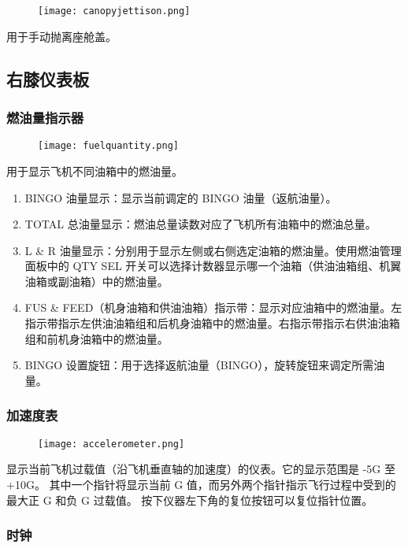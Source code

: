 \begin{figure}[htb]
  \center
  \texttt{[image: canopyjettison.png]}
\end{figure}
用于手动抛离座舱盖。

\subsection{右膝仪表板}

\subsubsection{燃油量指示器}

\begin{figure}[htb]
  \center
  \texttt{[image: fuelquantity.png]}
\end{figure}
用于显示飞机不同油箱中的燃油量。

\begin{enumerate}
  \item BINGO 油量显示：显示当前调定的 BINGO 油量（返航油量）。
  \item TOTAL 总油量显示：燃油总量读数对应了飞机所有油箱中的燃油总量。
  \item L \& R 油量显示：分别用于显示左侧或右侧选定油箱的燃油量。使用燃油管理面板中的 QTY SEL 开关可以选择计数器显示哪一个油箱（供油油箱组、机翼油箱或副油箱）中的燃油量。
  \item FUS \& FEED（机身油箱和供油油箱）指示带：显示对应油箱中的燃油量。左指示带指示左供油油箱组和后机身油箱中的燃油量。右指示带指示右供油油箱组和前机身油箱中的燃油量。
  \item BINGO 设置旋钮：用于选择返航油量（BINGO），旋转旋钮来调定所需油量。
\end{enumerate}

\subsubsection{加速度表}

\begin{figure}[htb]
  \center
  \texttt{[image: accelerometer.png]}
\end{figure}
显示当前飞机过载值（沿飞机垂直轴的加速度）的仪表。它的显示范围是 -5G 至 +10G。 其中一个指针将显示当前 G 值，而另外两个指针指示飞行过程中受到的最大正 G 和负 G 过载值。 按下仪器左下角的复位按钮可以复位指针位置。

\subsubsection{时钟}

